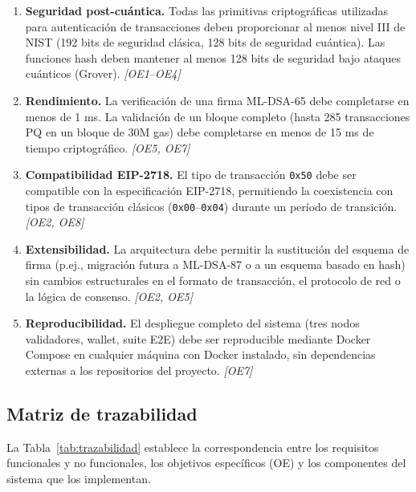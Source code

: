 \begin{enumerate}[label=\textbf{RNF\arabic{enumi}:}, leftmargin=3.5em, labelsep=0.5em]
  \setcounter{enumi}{0}
  
  \item \textbf{Seguridad post-cuántica.} Todas las primitivas criptográficas utilizadas para autenticación de transacciones deben proporcionar al menos nivel III de NIST (192 bits de seguridad clásica, 128 bits de seguridad cuántica). Las funciones hash deben mantener al menos 128 bits de seguridad bajo ataques cuánticos (Grover). \hfill \emph{[OE1--OE4]}
  
  \item \textbf{Rendimiento.} La verificación de una firma ML-DSA-65 debe completarse en menos de 1 ms. La validación de un bloque completo (hasta 285 transacciones PQ en un bloque de 30M gas) debe completarse en menos de 15 ms de tiempo criptográfico. \hfill \emph{[OE5, OE7]}
  
  \item \textbf{Compatibilidad EIP-2718.} El tipo de transacción \texttt{0x50} debe ser compatible con la especificación EIP-2718, permitiendo la coexistencia con tipos de transacción clásicos (\texttt{0x00}--\texttt{0x04}) durante un período de transición. \hfill \emph{[OE2, OE8]}
  
  \item \textbf{Extensibilidad.} La arquitectura debe permitir la sustitución del esquema de firma (p.ej., migración futura a ML-DSA-87 o a un esquema basado en hash) sin cambios estructurales en el formato de transacción, el protocolo de red o la lógica de consenso. \hfill \emph{[OE2, OE5]}
  
  \item \textbf{Reproducibilidad.} El despliegue completo del sistema (tres nodos validadores, wallet, suite E2E) debe ser reproducible mediante Docker Compose en cualquier máquina con Docker instalado, sin dependencias externas a los repositorios del proyecto. \hfill \emph{[OE7]}
\end{enumerate}

\subsection{Matriz de trazabilidad}

La Tabla~\ref{tab:trazabilidad} establece la correspondencia entre los requisitos funcionales y no funcionales, los objetivos específicos (OE) y los componentes del sistema que los implementan.

